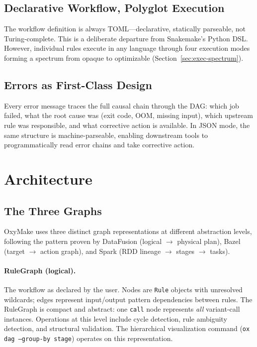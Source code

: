 \documentclass[12pt,a4paper]{article}
\newcommand{\code}[1]{{\texttt{\small\color{inlinecode}#1}}}
\begin{document}
\subsection{Declarative Workflow, Polyglot Execution}

The workflow definition is always TOML---declarative, statically parseable,
not Turing-complete. This is a deliberate departure from Snakemake's Python
DSL. However, individual rules execute in any language through four
execution modes forming a spectrum from opaque to optimizable
(Section~\ref{sec:exec-spectrum}).

\subsection{Errors as First-Class Design}

Every error message traces the full causal chain through the DAG: which job
failed, what the root cause was (exit code, OOM, missing input), which
upstream rule was responsible, and what corrective action is available. In
JSON mode, the same structure is machine-parseable, enabling downstream tools to
programmatically read error chains and take corrective action.

\section{Architecture}
\label{sec:architecture}

\subsection{The Three Graphs}
\label{sec:three-graphs}

OxyMake uses three distinct graph representations at different abstraction
levels, following the pattern proven by DataFusion (logical $\to$ physical
plan), Bazel (target $\to$ action graph), and Spark (RDD lineage $\to$
stages $\to$ tasks).

\paragraph{RuleGraph (logical).}
The workflow as declared by the user. Nodes are \code{Rule} objects with
unresolved wildcards; edges represent input/output pattern dependencies
between rules. The RuleGraph is compact and abstract: one \code{call}
node represents \emph{all} variant-call instances. Operations at this level
include cycle detection, rule ambiguity detection, and structural
validation. The hierarchical visualization command (\code{ox dag
--group-by stage}) operates on this representation.
\end{document}
